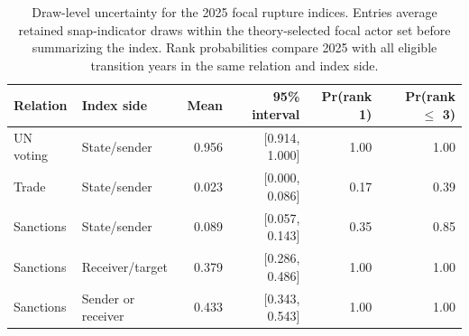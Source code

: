 \begin{table}[ht]
\centering
\caption{Draw-level uncertainty for the 2025 focal rupture indices. Entries average retained snap-indicator draws within the theory-selected focal actor set before summarizing the index. Rank probabilities compare 2025 with all eligible transition years in the same relation and index side.}
\label{tab:snap-index-uncertainty}
\small
\begin{tabularx}{\textwidth}{@{}l l r r r r@{}}
\toprule
\textbf{Relation} & \textbf{Index side} & \textbf{Mean} & \textbf{95\% interval} & \textbf{Pr(rank 1)} & \textbf{Pr(rank $\leq$ 3)} \\
\midrule
UN voting & State/sender & 0.956 & [0.914, 1.000] & 1.00 & 1.00 \\
Trade & State/sender & 0.023 & [0.000, 0.086] & 0.17 & 0.39 \\
Sanctions & State/sender & 0.089 & [0.057, 0.143] & 0.35 & 0.85 \\
Sanctions & Receiver/target & 0.379 & [0.286, 0.486] & 1.00 & 1.00 \\
Sanctions & Sender or receiver & 0.433 & [0.343, 0.543] & 1.00 & 1.00 \\
\bottomrule
\end{tabularx}
\end{table}
